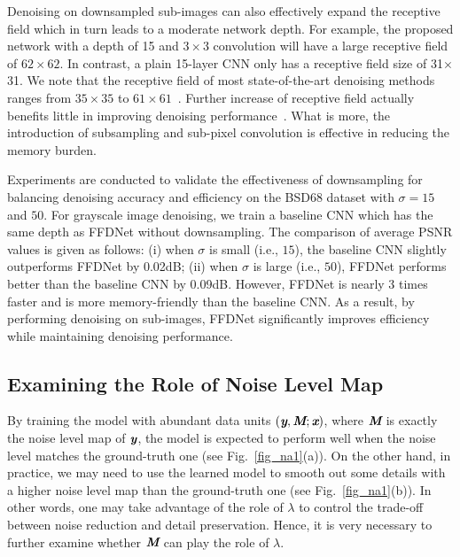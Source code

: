 \documentclass[journal]{IEEEtran}
\begin{document}
Denoising on downsampled sub-images can also effectively expand the receptive field which in turn leads to a moderate network depth. For example, the proposed network with a depth of 15 and $3\times3$ convolution will have a large receptive field of $62\times62$.
In contrast, a plain 15-layer CNN only has a receptive field size of 31$\times$31.
We note that the receptive field of most state-of-the-art denoising methods ranges from $35\times35$ to $61\times61$~\cite{zhang2017beyond}.
Further increase of receptive field actually benefits little in improving denoising performance~\cite{levin2011natural}.
What is more, the introduction of subsampling and sub-pixel convolution is effective in reducing the memory burden.


Experiments are conducted to validate the effectiveness of downsampling for balancing denoising accuracy and efficiency on the BSD68 dataset with $\sigma=15$ and $50$. For grayscale image denoising, we train a baseline CNN which has the same depth as FFDNet without downsampling. The comparison of average PSNR values is given as follows: (i) when $\sigma$ is small (i.e., $15$), the baseline CNN slightly outperforms FFDNet by 0.02dB; (ii) when $\sigma$ is large (i.e., $50$), FFDNet performs better than the baseline CNN by 0.09dB. However, FFDNet is nearly 3 times faster and is more memory-friendly than the baseline CNN. As a result, by performing denoising on sub-images, FFDNet significantly improves efficiency while maintaining denoising performance.

\subsection{{Examining the Role of Noise Level Map}}

By training the model with abundant data units $(\emph{\textbf{y}}, \emph{\textbf{M}}; \emph{\textbf{x}})$, where $\emph{\textbf{M}}$ is exactly the noise level map of $\emph{\textbf{y}}$, the model is expected to perform well when the noise level matches the ground-truth one (see Fig.~\ref{fig_na1}(a)).
On the other hand, in practice, we may need to use the learned model to smooth out some details with a higher noise level map than the ground-truth one (see Fig.~\ref{fig_na1}(b)).
In other words, one may take advantage of the role of $\lambda$ to control the trade-off between noise reduction and detail preservation.
Hence, it is very necessary to further examine whether $\emph{\textbf{M}}$ can play the role of $\lambda$.
\end{document}
